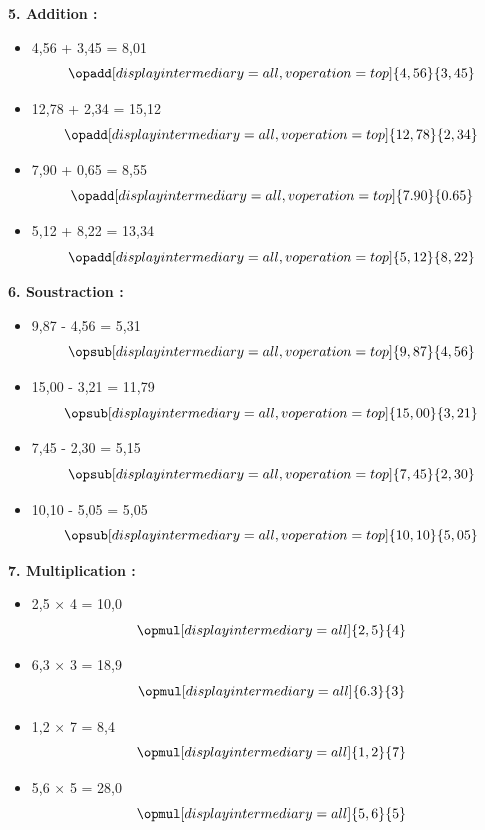 \documentclass{article}
\begin{document}
\begin{tcolorbox}[colback=green!10!white, colframe=green!75!black, sharp corners=south, boxrule=0.8mm, title=Corrections]
    \textbf{5. Addition :}
    \begin{itemize}
        \item 4,56 + 3,45 = 8,01
        \[
        \opadd[displayintermediary=all,voperation=top]{4,56}{3,45}
        \]
        \item 12,78 + 2,34 = 15,12
        \[
        \opadd[displayintermediary=all,voperation=top]{12,78}{2,34}
        \]
        \item 7,90 + 0,65 = 8,55
        \[
        \opadd[displayintermediary=all,voperation=top]{7.90}{0.65}
        \]
        \item 5,12 + 8,22 = 13,34
        \[
        \opadd[displayintermediary=all,voperation=top]{5,12}{8,22}
        \]
    \end{itemize}
\end{tcolorbox}

\begin{tcolorbox}[colback=green!10!white, colframe=green!75!black, sharp corners=south, boxrule=0.8mm, title=Corrections]
    \textbf{6. Soustraction :}
    \begin{itemize}
        \item 9,87 - 4,56 = 5,31
        \[
        \opsub[displayintermediary=all,voperation=top]{9,87}{4,56}
        \]
        \item 15,00 - 3,21 = 11,79
        \[
        \opsub[displayintermediary=all,voperation=top]{15,00}{3,21}
        \]
        \item 7,45 - 2,30 = 5,15
        \[
        \opsub[displayintermediary=all,voperation=top]{7,45}{2,30}
        \]
        \item 10,10 - 5,05 = 5,05
        \[
        \opsub[displayintermediary=all,voperation=top]{10,10}{5,05}
        \]
    \end{itemize}

    \textbf{7. Multiplication :}
    \begin{itemize}
        \item 2,5 × 4 = 10,0
        \[
        \opmul[displayintermediary=all]{2,5}{4}
        \]
        \item 6,3 × 3 = 18,9
        \[
        \opmul[displayintermediary=all]{6.3}{3}
        \]
        \item 1,2 × 7 = 8,4
        \[
        \opmul[displayintermediary=all]{1,2}{7}
        \]
        \item 5,6 × 5 = 28,0
        \[
        \opmul[displayintermediary=all]{5,6}{5}
        \]
    \end{itemize}
\end{tcolorbox}
\end{document}
